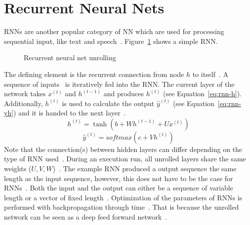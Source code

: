 \section{Recurrent Neural Nets}
\acp{RNN} are another popular category of \ac{NN} which are used for processing sequential input,
like text and speech~\citep{chauhan_review_2018}.
Figure~\ref{fig:rnn-unrolling} shows a simple \ac{RNN}.
\begin{figure}[ht]
    \centering
    \caption[Simple recurrent neural net]{%
        Recurrent neural net unrolling~\citep{goodfellow_deep_2016}\label{fig:rnn-unrolling}
    }
\end{figure}
The defining element is the recurrent connection from node $h$ to itself~\citep{goodfellow_deep_2016}.
A sequence of inputs \x\ is iteratively fed into the \ac{RNN}.
The current layer of the network takes $x^{(t)}$ and $h^{(t-1)}$ and produces $h^{(t)}$
(see Equation~\ref{eq:rnn-h}).
Additionally, $h^{(t)}$ is used to calculate the output $\hat{y}^{(t)}$ (see Equation~\ref{eq:rnn-yh})
and it is handed to the next layer~\citep{goodfellow_deep_2016}.
\begin{equation}\label{eq:rnn-h}
    h^{(t)} = \tanh(b+Wh^{(t-1)}+Ux^{(t)})
\end{equation}
\begin{equation}\label{eq:rnn-yh}
    \hat{y}^{(t)} = softmax(c + Vh^{(t)})
\end{equation}
Note that the connection(s) between hidden layers can differ depending on the type of \ac{RNN}
used~\citep{goodfellow_deep_2016}.
During an execution run, all unrolled layers share the same weights
($U,V,W$)~\citep{chauhan_review_2018}.
The example \ac{RNN} produced a output sequence the same length as the input
sequence, however, this does not have to be the case for \acp{RNN}~\citep{goodfellow_deep_2016}.
Both the input and the output can either be a sequence of variable length or a vector of fixed
length~\citep{goodfellow_deep_2016}.
Optimization of the parameters of \acp{RNN} is performed with backpropagation through
time~\citep{sherstinsky_fundamentals_2020}.
That is because the unrolled network can be seen as a deep feed forward
network~\citep{chauhan_review_2018}.

